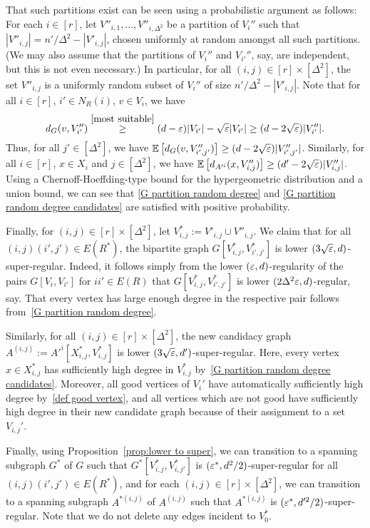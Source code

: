 \documentclass[10pt]{amsart}
\theoremstyle{definition}
\theoremstyle{claimstyle}
\theoremstyle{stepstyle}
\numberwithin{equation}{section}
\begin{document}
That such partitions exist can be seen using a probabilistic argument as follows:
For each $i\in[r]$, let $V''_{i,1},\dots,V''_{i,\Delta^2}$ be a partition of $V_i''$ such that $|V''_{i,j}|=n'/\Delta^2-|V'_{i,j}|$, chosen uniformly at random amongst all such partitions. (We may also assume that the partitions of $V_{i}''$ and $V_{i'}''$, say, are independent, but this is not even necessary.)
In particular, for all $(i,j)\in [r]\times [\Delta^2]$, the set $V''_{i,j}$ is a uniformly random subset of $V_i''$ of size $n'/\Delta^2-|V'_{i,j}|$. Note that for all $i\in[r]$, $i'\in N_R(i)$, $v\in V_i$, we have $$d_G(v,V''_{i'}) \overset{\eqref{most suitable}}{\ge} (d-{\varepsilon})|V_{i'}|-\sqrt{{\varepsilon}} |V_{i'}| \ge (d-2\sqrt{{\varepsilon}})|V_{i'}''|.$$ Thus, for all $j'\in[\Delta^2]$, we have $\mathrm{\mathbb{E}}\left[d_G(v,V''_{i',j'})\right] \ge  (d-2 \sqrt{{\varepsilon}})|V''_{i',j'}|$. Similarly, for all $i\in[r]$, $x\in X_i$ and $j\in[\Delta^2]$, we have $\mathrm{\mathbb{E}}\left[d_{A'^i}(x,V''_{i,j})\right]\ge (d'-2 \sqrt{{\varepsilon}})|V''_{i,j}|$.
Using a Chernoff-Hoeffding-type bound for the hypergeometric distribution and a union bound, we can see that \eqref{G partition random degree} and \eqref{G partition random degree candidates} are satisfied with positive probability.


Finally, for $(i,j)\in [r]\times [\Delta^2]$, let $V^\ast_{i,j}:= V'_{i,j} \cup V''_{i,j}$.
We claim that for all $(i,j)(i',j')\in E(R^\ast)$, the bipartite graph $G[V^\ast_{i,j},V^\ast_{i',j'}]$ is lower $(3\sqrt{{\varepsilon}},d)$-super-regular. Indeed, it follows simply from the lower $({\varepsilon},d)$-regularity of the pairs $G[V_i,V_{i'}]$ for $ii'\in E(R)$ that $G[V^\ast_{i,j},V^\ast_{i',j'}]$ is lower $(2\Delta^2{\varepsilon},d)$-regular, say.
That every vertex has large enough degree in the respective pair follows from~\eqref{G partition random degree}.

Similarly, for all $(i,j)\in [r]\times [\Delta^2]$, the new candidacy graph $A^{(i,j)}:=A'^i[X^\ast_{i,j},V^\ast_{i,j}]$ is lower $(3\sqrt{{\varepsilon}},d')$-super-regular. Here, every vertex $x\in X^\ast_{i,j}$ has sufficiently high degree in $V^\ast_{i,j}$ by~\eqref{G partition random degree candidates}. Moreover, all good vertices of $V_i'$ have automatically sufficiently high degree by~\eqref{def good vertex}, and all vertices which are not good have sufficiently high degree in their new candidate graph because of their assignment to a set $V_{i,j}'$.


Finally, using Proposition~\ref{prop:lower to super}, we can transition to a spanning subgraph $G^\ast$ of $G$ such that $G^\ast[V^\ast_{i,j},V^\ast_{i,j'}]$ is $({\varepsilon}^\ast,d^2/2)$-super-regular for all $(i,j)(i',j')\in E(R^\ast)$, and for each $(i,j)\in [r]\times[\Delta^2]$, we can transition to a spanning subgraph $A^{\ast(i,j)}$ of $A^{(i,j)}$ such that $A^{\ast(i,j)}$ is $({\varepsilon}^\ast,d'^2/2)$-super-regular. Note that we do not delete any edges incident to $V_0^\ast$.
\end{document}
